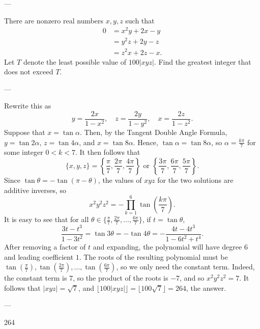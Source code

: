 
---

There are nonzero real numbers $x,y,z$ such that
\begin{align*}
    0&=x^2y+2x-y\\ &=y^2z+2y-z\\ &=z^2x+2z-x.
\end{align*}
Let $T$ denote the least possible value of $100|xyz|$. Find the greatest integer that does not exceed $T$.

---

Rewrite this as \[y=\frac{2x}{1-x^2},\quad z=\frac{2y}{1-y^2},\quad x=\frac{2z}{1-z^2}.\]
Suppose that $x=\tan\alpha$. Then, by the Tangent Double Angle Formula, $y=\tan 2\alpha$, $z=\tan 4\alpha$, and $x=\tan 8\alpha$. Hence, $\tan\alpha=\tan 8\alpha$, so $\alpha=\tfrac{k\pi}7$ for some integer $0<k<7$. It then follows that \[\{x,y,z\}=\left\{\frac{\pi}7,\frac{2\pi}7,\frac{4\pi}7\right\}\text{ or }\left\{\frac{3\pi}7,\frac{6\pi}7,\frac{5\pi}7\right\}.\]
Since $\tan\theta=-\tan(\pi-\theta)$, the values of $xyz$ for the two solutions are additive inverses, so \[x^2y^2z^2=-\prod_{k=1}^6\tan\left(\frac{k\pi}7\right).\]
It is easy to see that for all $\theta\in\{\tfrac{\pi}7,\tfrac{2\pi}7,\ldots,\tfrac{6\pi}7\}$, if $t=\tan\theta$, \[\frac{3t-t^3}{1-3t^2}=\tan 3\theta=-\tan 4\theta=-\frac{4t-4t^3}{1-6t^2+t^4}.\]
After removing a factor of $t$ and expanding, the polynomial will have degree $6$ and leading coefficient $1$. The roots of the resulting polynomial must be $\tan(\frac{\pi}7),\tan(\frac{2\pi}7),\ldots,\tan(\frac{6\pi}7)$, so we only need the constant term. Indeed, the constant term is $7$, so the product of the roots is $-7$, and so $x^2y^2z^2=7$. It follows that $|xyz|=\sqrt7$, and $\big\lfloor 100|xyz|\big\rfloor=\big\lfloor 100\sqrt7\big\rfloor=264$, the answer.

---

264
